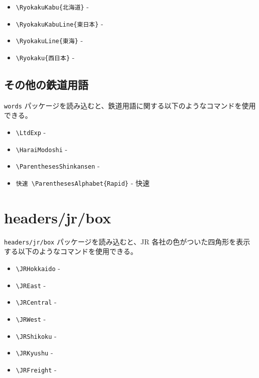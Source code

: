\documentclass[oneside,10pt,a4paper]{jsarticle}
\begin{document}
  \begin{itemize}
    \item \verb|\RyokakuKabu{北海道}| - 
    \item \verb|\RyokakuKabuLine{東日本}| - 
    \item \verb|\RyokakuLine{東海}| - 
    \item \verb|\Ryokaku{西日本}| - 
  \end{itemize}

  \subsection{その他の鉄道用語}

  \verb|words| パッケージを読み込むと、鉄道用語に関する以下のようなコマンドを使用できる。

  \begin{itemize}
    \item \verb|\LtdExp| - \LtdExp
    \item \verb|\HaraiModoshi| - \HaraiModoshi
    \item \verb|\ParenthesesShinkansen| - \ParenthesesShinkansen
    \item \verb|快速 \ParenthesesAlphabet{Rapid}| - 快速 
  \end{itemize}

  \section{headers/jr/box}

  \verb|headers/jr/box| パッケージを読み込むと、JR 各社の色がついた四角形を表示する以下のようなコマンドを使用できる。

  \begin{itemize}
    \item \verb|\JRHokkaido| - \JRHokkaido
    \item \verb|\JREast| - \JREast
    \item \verb|\JRCentral| - \JRCentral
    \item \verb|\JRWest| - \JRWest
    \item \verb|\JRShikoku| - \JRShikoku
    \item \verb|\JRKyushu| - \JRKyushu
    \item \verb|\JRFreight| - \JRFreight
  \end{itemize}

  \newpage
\end{document}
